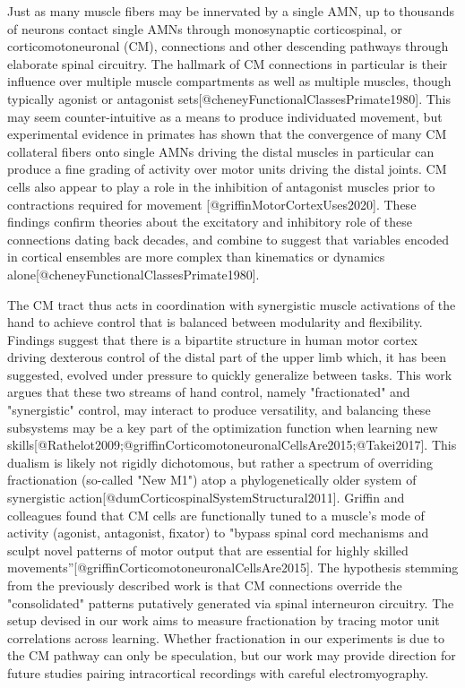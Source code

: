 \documentclass[../main.tex]{subfiles}
\begin{document}
{Just as many muscle fibers may be innervated by a single AMN, up to thousands of neurons contact single AMNs through monosynaptic corticospinal, or corticomotoneuronal (CM), connections and other descending pathways through elaborate spinal circuitry. The hallmark of CM connections in particular is their influence over multiple muscle compartments as well as multiple muscles, though typically agonist or antagonist sets[@cheneyFunctionalClassesPrimate1980]. This may seem counter-intuitive as a means to produce individuated movement, but experimental evidence in primates has shown that the convergence of many CM collateral fibers onto single AMNs driving the distal muscles in particular can produce a fine grading of activity over motor units driving the distal joints. CM cells also appear to play a role in the inhibition of antagonist muscles prior to contractions required for movement [@griffinMotorCortexUses2020]. These findings confirm theories about the excitatory and inhibitory role of these connections dating back decades, and combine to suggest that variables encoded in cortical ensembles are more complex than kinematics or dynamics alone[@cheneyFunctionalClassesPrimate1980].

The CM tract thus acts in coordination with synergistic muscle activations of the hand to achieve control that is balanced between modularity and flexibility. Findings suggest that there is a bipartite structure in human motor cortex driving dexterous control of the distal part of the upper limb which, it has been suggested, evolved under pressure to quickly generalize between tasks. This work argues that these two streams of hand control, namely "fractionated" and "synergistic" control, may interact to produce versatility, and balancing these subsystems may be a key part of the optimization function when learning new skills[@Rathelot2009;@griffinCorticomotoneuronalCellsAre2015;@Takei2017]. This dualism is likely not rigidly dichotomous, but rather a spectrum of overriding fractionation (so-called "New M1") atop a phylogenetically older system of synergistic action[@dumCorticospinalSystemStructural2011]. Griffin and colleagues found that CM cells are functionally tuned to a muscle's mode of activity (agonist, antagonist, fixator) to "bypass spinal cord mechanisms and sculpt novel patterns of motor output that are essential for highly skilled movements”[@griffinCorticomotoneuronalCellsAre2015]. The hypothesis stemming from the previously described work is that CM connections override the "consolidated" patterns putatively generated via spinal interneuron circuitry. The setup devised in our work aims to measure fractionation by tracing motor unit correlations across learning. Whether fractionation in our experiments is due to the CM pathway can only be speculation, but our work may provide direction for future studies pairing intracortical recordings with careful electromyography.

}
\end{document}
